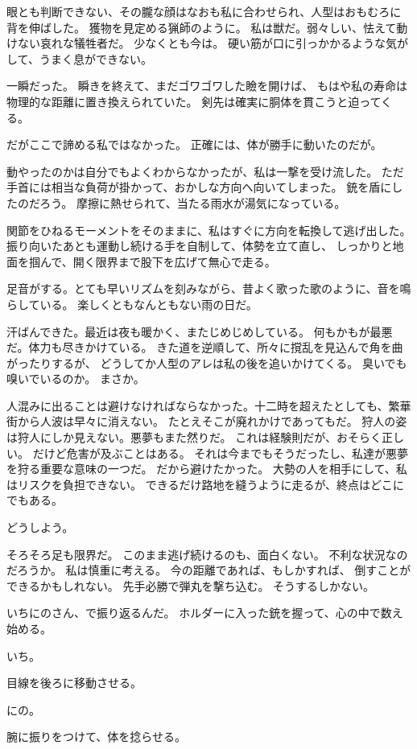 \documentclass[../IHMain]{subfiles}
\begin{document}
眼とも判断できない、その朧な顔はなおも私に合わせられ、人型はおもむろに背を伸ばした。
獲物を見定める猟師のように。
私は獣だ。弱々しい、怯えて動けない哀れな犠牲者だ。
少なくとも今は。
硬い筋が口に引っかかるような気がして、うまく息ができない。

一瞬だった。
瞬きを終えて、まだゴワゴワした瞼を開けば、
もはや私の寿命は物理的な距離に置き換えられていた。
剣先は確実に胴体を貫こうと迫ってくる。

だがここで諦める私ではなかった。
正確には、体が勝手に動いたのだが。

動やったのかは自分でもよくわからなかったが、私は一撃を受け流した。
ただ手首には相当な負荷が掛かって、おかしな方向へ向いてしまった。
銃を盾にしたのだろう。
摩擦に熱せられて、当たる雨水が湯気になっている。

関節をひねるモーメントをそのままに、私はすぐに方向を転換して逃げ出した。
振り向いたあとも運動し続ける手を自制して、体勢を立て直し、
しっかりと地面を掴んで、開く限界まで股下を広げて無心で走る。

足音がする。とても早いリズムを刻みながら、昔よく歌った歌のように、音を鳴らしている。
楽しくともなんともない雨の日だ。

汗ばんできた。最近は夜も暖かく、またじめじめしている。
何もかもが最悪だ。体力も尽きかけている。
きた道を逆順して、所々に撹乱を見込んで角を曲がったりするが、
どうしてか人型のアレは私の後を追いかけてくる。
臭いでも嗅いでいるのか。
まさか。

人混みに出ることは避けなければならなかった。十二時を超えたとしても、繁華街から人波は早々に消えない。
たとえそこが廃れかけであってもだ。
狩人の姿は狩人にしか見えない。悪夢もまた然りだ。
これは経験則だが、おそらく正しい。
だけど危害が及ぶことはある。
それは今までもそうだったし、私達が悪夢を狩る重要な意味の一つだ。
だから避けたかった。
大勢の人を相手にして、私はリスクを負担できない。
できるだけ路地を縫うように走るが、終点はどこにでもある。

どうしよう。

そろそろ足も限界だ。
このまま逃げ続けるのも、面白くない。
不利な状況なのだろうか。
私は慎重に考える。
今の距離であれば、もしかすれば、
倒すことができるかもしれない。
先手必勝で弾丸を撃ち込む。
そうするしかない。

いちにのさん、で振り返るんだ。
ホルダーに入った銃を握って、心の中で数え始める。

いち。

目線を後ろに移動させる。

にの。

腕に振りをつけて、体を捻らせる。
\end{document}
